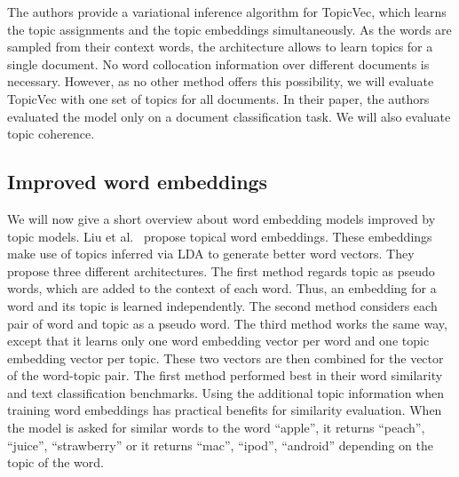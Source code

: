 \documentclass[
        a4paper,
        titlepage,
        twoside,
        parskip,
        numbers=noenddot
        ]{scrbook}
\theoremstyle{break}
\begin{document}
The authors provide a variational inference algorithm for TopicVec, which learns the topic assignments and the topic embeddings simultaneously.
As the words are sampled from their context words, the architecture allows to learn topics for a single document.
No word collocation information over different documents is necessary.
However, as no other method offers this possibility, we will evaluate TopicVec with one set of topics for all documents.
In their paper, the authors evaluated the model only on a document classification task.
We will also evaluate topic coherence.



\subsection{Improved word embeddings}
We will now give a short overview about word embedding models improved by topic models.
Liu et al.~\cite{Liu2015} propose topical word embeddings.
These embeddings make use of topics inferred via LDA to generate better word vectors.
They propose three different architectures.
The first method regards topic as pseudo words, which are added to the context of each word.
Thus, an embedding for a word and its topic is learned independently.
The second method considers each pair of word and topic as a pseudo word.
The third method works the same way, except that it learns only one word embedding vector per word and one topic embedding vector per topic.
These two vectors are then combined for the vector of the word-topic pair.
The first method performed best in their word similarity and text classification benchmarks.
Using the additional topic information when training word embeddings has practical benefits for similarity evaluation.
When the model is asked for similar words to the word ``apple'', it returns ``peach'', ``juice'', ``strawberry'' or it returns ``mac'', ``ipod'', ``android'' depending on the topic of the word.
\end{document}
